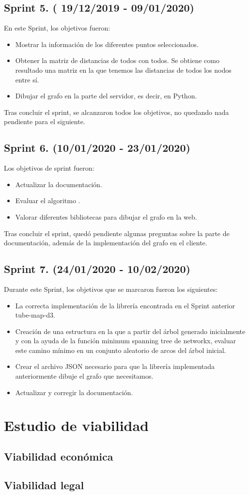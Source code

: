 \subsection{Sprint 5. ( 19/12/2019 - 09/01/2020)}
En este Sprint, los objetivos fueron:
\begin{itemize}
	\item Mostrar la información de los diferentes puntos seleccionados.
	\item Obtener la matriz de distancias de todos con todos. Se obtiene como resultado una matriz en la que tenemos las distancias de todos los nodos entre sí.
	\item Dibujar el grafo en la parte del servidor, es decir, en Python.
\end{itemize}
Tras concluir el sprint, se alcanzaron todos los objetivos, no quedando nada pendiente para el siguiente.
\subsection{Sprint 6. (10/01/2020 - 23/01/2020)}
Los objetivos de sprint fueron:
\begin{itemize}
	\item Actualizar la documentación.
	\item Evaluar el algoritmo \cite{minimum spanning tree}.
	\item Valorar diferentes bibliotecas para dibujar el grafo en la web.
\end{itemize}
Tras concluir el sprint, quedó pendiente algunas preguntas sobre la parte de documentación, además de la implementación del grafo en el cliente.
\subsection{Sprint 7. (24/01/2020 - 10/02/2020)}
Durante este Sprint, los objetivos que se marcaron fueron los siguientes:
\begin{itemize}
	\item La correcta implementación de la librería encontrada en el Sprint anterior tube-map-d3.
	\item Creación de una estructura en la que a partir del árbol generado inicialmente y con la ayuda de la función minimum spanning tree de networkx, evaluar este camino mínimo en un conjunto aleatorio de arcos del árbol inicial.
	\item Crear el archivo JSON necesario para que la librería implementada anteriormente dibuje el grafo que necesitamos. 
	\item Actualizar y corregir la documentación.
\end{itemize}

\section{Estudio de viabilidad}

\subsection{Viabilidad económica}

\subsection{Viabilidad legal}


